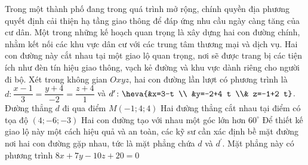 \begin{ex}%
    Trong một thành phố đang trong quá trình mở rộng, chính quyền địa phương quyết định cải thiện hạ tầng giao thông để đáp ứng nhu cầu ngày càng tăng của cư dân. Một trong những kế hoạch quan trọng là xây dựng hai con đường chính, nhằm kết nối các khu vực dân cư với các trung tâm thương mại và dịch vụ. Hai con đường này cắt nhau tại một giao lộ quan trọng, nơi sẽ được trang bị các tiện ích như đèn tín hiệu giao thông, vạch kẻ đường và khu vực dành riêng cho người đi bộ. Xét trong không gian $O x y z$, hai con đường lần lượt có phương trình là $d\colon \dfrac{x-1}{3}=\dfrac{y+4}{-2}=\dfrac{z+4}{1}$ và $d'\colon\heva{&x=3-t \\ &y=-2+4 t \\& z=-1+2 t}$.
    \choiceTF
    {Đường thẳng $d$ đi qua điểm $M(-1 ; 4 ; 4)$}
    {\True Hai đường thẳng cắt nhau tại điểm có tọa độ $(4 ;-6 ;-3)$}
    {Hai con đường tạo với nhau một góc lớn hơn $60^{\circ}$}
    {Để thiết kế giao lộ này một cách hiệu quả và an toàn, các kỹ sư cần xác định bề mặt đường nơi hai con đường gặp nhau, tức là mặt phẳng chứa $d$ và $d^{\prime}$. Mặt phẳng này có phương trình $8 x+7 y-10 z+20=0$}
\end{ex}
